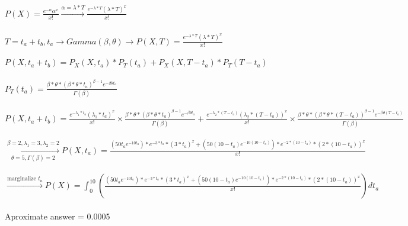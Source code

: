     \begin{latin}
        \noindent
        $P(X) = \frac{e^{-\alpha}\alpha^{x}}{x!} \xrightarrow[]{\alpha = \lambda * T}\frac{e^{-\lambda * T}(\lambda * T)^{x}}{x!}$ \\
        \\$T = t_a + t_b, t_a \rightarrow Gamma(\beta,\theta) \rightarrow P(X,T)=\frac{e^{-\lambda * T}(\lambda * T)^{x}}{x!}$\\ \\
        $P(X,t_a+t_b) = P_X(X,t_a)*P_T(t_a) + P_X(X,T-t_a)*P_T(T-t_a)$ \\\\
        $P_T(t_a) = \frac{\beta*\theta*(\beta*\theta*t_a)^{\beta-1}e^{-\beta \theta t_a}}{\Gamma(\beta)}$\\
        \\$P(X,t_a+t_b) = \frac{e^{-\lambda_1 * t_a}(\lambda_1 * t_a)^{x}}{x!}\times\frac{\beta*\theta*(\beta*\theta*t_a)^{\beta-1}e^{-\beta \theta t_a}}{\Gamma(\beta)} + 
        \frac{e^{-\lambda_2 * (T-t_a)}(\lambda_2 * (T-t_a))^{x}}{x!}\times\frac{\beta*\theta*(\beta*\theta*(T-t_a))^{\beta-1}e^{-\beta \theta (T-t_a)}}{\Gamma(\beta)}$\\\\
        $\xrightarrow[\theta=5,\Gamma(\beta) = 2]{\beta=2,\lambda_1=3,\lambda_2=2}
         P(X,t_a)=\frac{(50t_ae^{-10t_a})*e^{-3*t_a}*(3*t_a)^x+(50(10-t_a)e^{-10(10-t_a)})*e^{-2*(10-t_a)}*(2*(10-t_a))^x}{x!}$\\
         \\ $\xrightarrow[]{\text{marginalize $t_a$}} P(X) = \int_{0}^{10}(\frac{(50t_ae^{-10t_a})*e^{-3*t_a}*(3*t_a)^x+(50(10-t_a)e^{-10(10-t_a)})*e^{-2*(10-t_a)}*(2*(10-t_a))^x}{x!})dt_a$
         \\\\ 
         Aproximate answer = 0.0005
    \end{latin}





